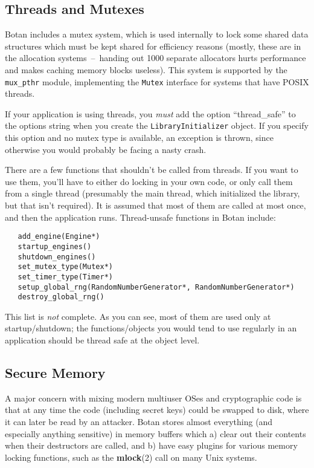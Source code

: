 \documentclass{article}
\newcommand{\function}[1]{\textbf{#1}}
\newcommand{\type}[1]{\texttt{#1}}
\begin{document}
\subsection{Threads and Mutexes}

Botan includes a mutex system, which is used internally to lock some shared
data structures which must be kept shared for efficiency reasons (mostly, these
are in the allocation systems~--~handing out 1000 separate allocators hurts
performance and makes caching memory blocks useless). This system is supported
by the \texttt{mux\_pthr} module, implementing the \type{Mutex} interface for
systems that have POSIX threads.

If your application is using threads, you \emph{must} add the option
``thread\_safe'' to the options string when you create the
\type{LibraryInitializer} object. If you specify this option and no mutex type
is available, an exception is thrown, since otherwise you would probably be
facing a nasty crash.

There are a few functions that shouldn't be called from threads. If you want to
use them, you'll have to either do locking in your own code, or only call them
from a single thread (presumably the main thread, which initialized the
library, but that isn't required). It is assumed that most of them are called
at most once, and then the application runs. Thread-unsafe functions in Botan
include:

\begin{verbatim}
   add_engine(Engine*)
   startup_engines()
   shutdown_engines()
   set_mutex_type(Mutex*)
   set_timer_type(Timer*)
   setup_global_rng(RandomNumberGenerator*, RandomNumberGenerator*)
   destroy_global_rng()
\end{verbatim}

This list is \emph{not} complete. As you can see, most of them are used only at
startup/shutdown; the functions/objects you would tend to use regularly in an
application should be thread safe at the object level.

\subsection{Secure Memory}

A major concern with mixing modern multiuser OSes and cryptographic code is
that at any time the code (including secret keys) could be swapped to disk,
where it can later be read by an attacker. Botan stores almost everything (and
especially anything sensitive) in memory buffers which a) clear out their
contents when their destructors are called, and b) have easy plugins for
various memory locking functions, such as the \function{mlock}(2) call on many
Unix systems.
\end{document}
